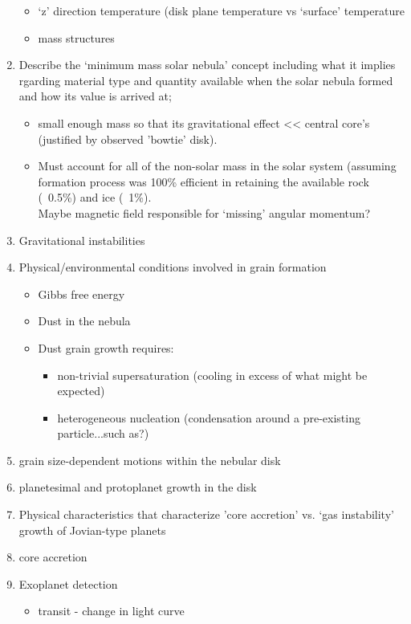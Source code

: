 \documentclass[12pt]{article}
\begin{document}
\begin{enumerate}
\begin{itemize}
  \item `z' direction temperature (disk plane temperature vs `surface'
  temperature \\
  \item mass structures \\
\end{itemize}
\item Describe the `minimum mass solar nebula' concept including what
it implies rgarding material type and quantity available when the
solar nebula formed and how its value is arrived at;
  \begin{itemize}
    \item small enough mass so that its gravitational effect <<
    central core's (justified by observed 'bowtie' disk).
    \item Must account for all of the non-solar mass in the solar
    system (assuming formation process was 100\% efficient in
    retaining the available rock (~0.5\%) and ice (~1\%).\\
    Maybe magnetic field responsible for `missing' angular momentum?
  \end{itemize}
\item Gravitational instabilities
\item Physical/environmental conditions involved in grain formation
\begin{itemize}
  \item Gibbs free energy
  \item Dust in the nebula
  \item Dust grain growth requires:
    \begin{itemize}
      \item non-trivial supersaturation (cooling in excess of what
      might be expected)
      \item heterogeneous nucleation (condensation around a
      pre-existing particle...such as?)
    \end{itemize}
\end{itemize}
\item grain size-dependent motions within the nebular disk
\item planetesimal and protoplanet growth in the disk
\item Physical characteristics that characterize 'core accretion' vs.
`gas instability' growth of Jovian-type planets
\item core accretion
\item Exoplanet detection
  \begin{itemize}
    \item transit - change in light curve

\end{itemize}
\end{enumerate}
\end{document}
